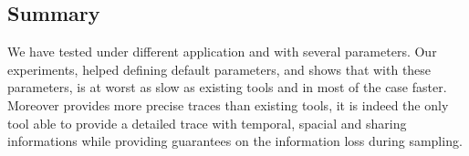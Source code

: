 \subsection{Summary}
\label{sec:expe-cncl}

We have tested \Moca under different application and with several parameters.
Our experiments, helped defining default parameters, and shows that with these
parameters, \Moca is at worst as slow as existing tools and in most of the
case faster. Moreover \Moca provides more precise traces than existing tools,
it is indeed the only tool able to provide a detailed trace with temporal,
spacial and sharing informations while providing guarantees on the information
loss during sampling.

